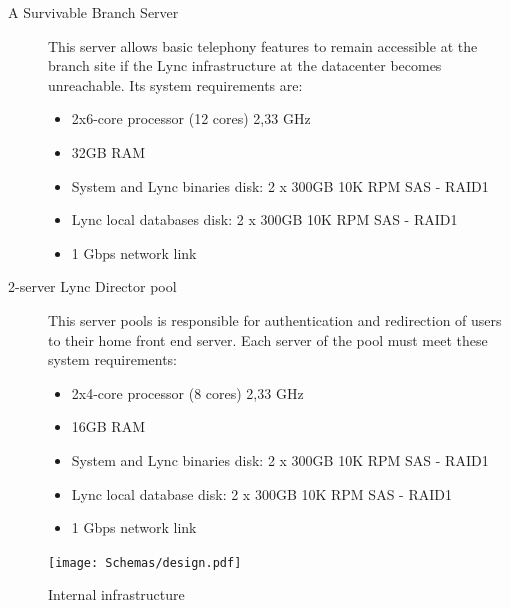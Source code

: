 \begin{description}
		
		\item[A Survivable Branch Server] This server allows basic telephony features to remain accessible at the branch site if the Lync infrastructure at the datacenter becomes unreachable.
		Its system requirements are:
		\begin{itemize}
			\item 2x6-core processor (12 cores) 2,33 GHz
			\item 32GB RAM
			\item System and Lync binaries disk: 2 x 300GB 10K RPM SAS - RAID1
			\item Lync local databases disk: 2 x 300GB 10K RPM SAS - RAID1
			\item 1 Gbps network link
		\end{itemize}
		
		
		\item[2-server Lync Director pool] This server pools is responsible for authentication and redirection of users to their home front end server.
		Each server of the pool must meet these system requirements:
		\begin{itemize}
			\item 2x4-core processor (8 cores) 2,33 GHz
			\item 16GB RAM
			\item System and Lync binaries disk: 2 x 300GB 10K RPM SAS - RAID1
			\item Lync local database disk: 2 x 300GB 10K RPM SAS - RAID1
			\item 1 Gbps network link
		\end{itemize}
		
	\end{description}

\begin{figure}[H]
	\centering
	\texttt{[image: Schemas/design.pdf]}
	\caption{Internal infrastructure}
	\label{fig:case_internal}
\end{figure}


